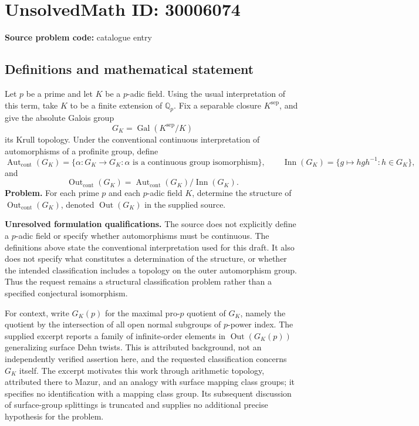 \documentclass[11pt]{article}
\newcommand{\Q}{\mathbb{Q}}
\begin{document}
\section*{UnsolvedMath ID: 30006074}
\textbf{Source problem code:} catalogue entry
\subsection{Definitions and mathematical statement}
Let \(p\) be a prime and let \(K\) be a \(p\)-adic field. Using the usual interpretation of this term, take \(K\) to be a finite extension of \(\Q_p\). Fix a separable closure \(K^{\mathrm{sep}}\), and give the absolute Galois group
\[
G_K=\operatorname{Gal}(K^{\mathrm{sep}}/K)
\]
its Krull topology. Under the conventional continuous interpretation of automorphisms of a profinite group, define
\[
\operatorname{Aut}_{\mathrm{cont}}(G_K)
 =\{\alpha:G_K\longrightarrow G_K:\alpha\text{ is a continuous group isomorphism}\},
\qquad
\operatorname{Inn}(G_K)
 =\{g\mapsto hgh^{-1}:h\in G_K\},
\]
and
\[
\operatorname{Out}_{\mathrm{cont}}(G_K)
 =\operatorname{Aut}_{\mathrm{cont}}(G_K)/\operatorname{Inn}(G_K).
\]
\textbf{Problem.} For each prime \(p\) and each \(p\)-adic field \(K\), determine the structure of \(\operatorname{Out}_{\mathrm{cont}}(G_K)\), denoted \(\operatorname{Out}(G_K)\) in the supplied source.

\textbf{Unresolved formulation qualifications.} The source does not explicitly define a \(p\)-adic field or specify whether automorphisms must be continuous. The definitions above state the conventional interpretation used for this draft. It also does not specify what constitutes a determination of the structure, or whether the intended classification includes a topology on the outer automorphism group. Thus the request remains a structural classification problem rather than a specified conjectural isomorphism.

For context, write \(G_K(p)\) for the maximal pro-\(p\) quotient of \(G_K\), namely the quotient by the intersection of all open normal subgroups of \(p\)-power index. The supplied excerpt reports a family of infinite-order elements in \(\operatorname{Out}(G_K(p))\) generalizing surface Dehn twists. This is attributed background, not an independently verified assertion here, and the requested classification concerns \(G_K\) itself. The excerpt motivates this work through arithmetic topology, attributed there to Mazur, and an analogy with surface mapping class groups; it specifies no identification with a mapping class group. Its subsequent discussion of surface-group splittings is truncated and supplies no additional precise hypothesis for the problem.
\end{document}

